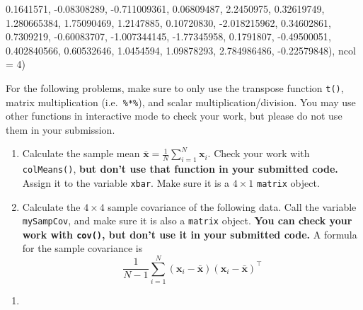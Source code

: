 \documentclass[12pt,krantz2]{krantz}
\makeatletter
\newenvironment{Shaded}{\begin{snugshade}}{\end{snugshade}}
\newcommand{\DataTypeTok}[1]{\textcolor[rgb]{0.27,0.27,0.27}{#1}}
\newcommand{\DecValTok}[1]{\textcolor[rgb]{0.06,0.06,0.06}{#1}}
\newcommand{\FloatTok}[1]{\textcolor[rgb]{0.06,0.06,0.06}{#1}}
\newcommand{\NormalTok}[1]{#1}
\newenvironment{kframe}{%
\medskip{}
\setlength{\fboxsep}{.8em}
 \def\at@end@of@kframe{}%
 \ifinner\ifhmode%
  \def\at@end@of@kframe{\end{minipage}}%
  \begin{minipage}{\columnwidth}%
 \fi\fi%
 \def\FrameCommand##1{\hskip\@totalleftmargin \hskip-\fboxsep
 \colorbox{shadecolor}{##1}\hskip-\fboxsep
     \hskip-\linewidth \hskip-\@totalleftmargin \hskip\columnwidth}%
 \MakeFramed {\advance\hsize-\width
   \@totalleftmargin\z@ \linewidth\hsize
   \@setminipage}}%
 {\par\unskip\endMakeFramed%
 \at@end@of@kframe}
\renewenvironment{Shaded}{\begin{kframe}}{\end{kframe}}
\makeatother
\begin{document}
\begin{Shaded}
\begin{Highlighting}[]
  \FloatTok{0.1641571}\NormalTok{, }\FloatTok{-0.08308289}\NormalTok{, }\FloatTok{-0.711009361}\NormalTok{,  }\FloatTok{0.06809487}\NormalTok{,}
  \FloatTok{2.2450975}\NormalTok{,  }\FloatTok{0.32619749}\NormalTok{,  }\FloatTok{1.280665384}\NormalTok{,  }\FloatTok{1.75090469}\NormalTok{,}
  \FloatTok{1.2147885}\NormalTok{,  }\FloatTok{0.10720830}\NormalTok{, }\FloatTok{-2.018215962}\NormalTok{,  }\FloatTok{0.34602861}\NormalTok{,}
  \FloatTok{0.7309219}\NormalTok{, }\FloatTok{-0.60083707}\NormalTok{, }\FloatTok{-1.007344145}\NormalTok{, }\FloatTok{-1.77345958}\NormalTok{,}
  \FloatTok{0.1791807}\NormalTok{, }\FloatTok{-0.49500051}\NormalTok{,  }\FloatTok{0.402840566}\NormalTok{,  }\FloatTok{0.60532646}\NormalTok{,}
  \FloatTok{1.0454594}\NormalTok{,  }\FloatTok{1.09878293}\NormalTok{,  }\FloatTok{2.784986486}\NormalTok{, }\FloatTok{-0.22579848}\NormalTok{), }\DataTypeTok{ncol =} \DecValTok{4}\NormalTok{)}
\end{Highlighting}
\end{Shaded}

For the following problems, make sure to only use the transpose function \texttt{t()}, matrix multiplication (i.e.~\texttt{\%*\%}), and scalar multiplication/division. You may use other functions in interactive mode to check your work, but please do not use them in your submission.

\begin{enumerate}
\def\labelenumi{\alph{enumi})}
\item
  Calculate the sample mean \(\bar{\mathbf{x}} = \frac{1}{N} \sum_{i=1}^N \mathbf{x}_i\). Check your work with \texttt{colMeans()}, \textbf{but don't use that function in your submitted code.} Assign it to the variable \texttt{xbar}. Make sure it is a \(4 \times 1\) \texttt{matrix} object.
\item
  Calculate the \(4 \times 4\) sample covariance of the following data. Call the variable \texttt{mySampCov}, and make sure it is also a \texttt{matrix} object. \textbf{You can check your work with \texttt{cov()}, but don't use it in your submitted code.} A formula for the sample covariance is
  \begin{equation} 
    \frac{1}{N-1} \sum_{i=1}^N (\mathbf{x}_i - \bar{\mathbf{x}})(\mathbf{x}_i - \bar{\mathbf{x}})^\intercal
    \end{equation}
\end{enumerate}

\begin{enumerate}
\def\labelenumi{\arabic{enumi}.}
\setcounter{enumi}{1}
\item
\end{enumerate}
\end{document}
